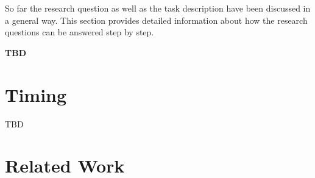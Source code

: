 \documentclass[a4paper]{article}
\begin{document}
So far the research question as well as the task description have been discussed in a general way.
This section provides detailed information about how the research questions can be answered step by step.

\textbf{TBD}


\section{Timing}
TBD
  

\section{Related Work}
\begingroup
\renewcommand{\section}[2]{}
\renewcommand{\refname}{}
\nocite{*}


\endgroup
\end{document}
